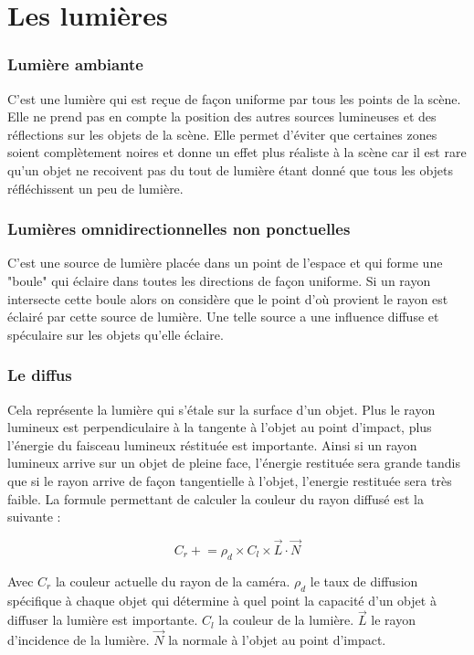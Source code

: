 \documentclass[fontsize=10pt, twoside=no]{scrartcl} %
\begin{document}
\part{Les lumières}

    \section{Lumière ambiante}

C'est une lumière qui est reçue de façon uniforme par tous les points de la scène. Elle ne prend pas en compte la
position des autres sources lumineuses et des réflections sur les objets de la scène. Elle permet d'éviter que certaines
zones soient complètement noires et donne un effet plus réaliste à la scène car il est rare qu'un objet ne recoivent pas
du tout de lumière étant donné que tous les objets réfléchissent un peu de lumière.

    \section{Lumières omnidirectionnelles non ponctuelles}

C'est une source de lumière placée dans un point de l'espace et qui forme une "boule" qui éclaire dans toutes les
directions de façon uniforme. Si un rayon intersecte cette boule alors on considère que le point d'où provient le rayon
est éclairé par cette source de lumière. Une telle source a une influence diffuse et spéculaire sur les objets qu'elle
éclaire.

    \section{Le diffus}

Cela représente la lumière qui s'étale sur la surface d'un objet. Plus le rayon lumineux est perpendiculaire à la
tangente à l'objet au point d'impact, plus l'énergie du faisceau lumineux réstituée est importante. Ainsi si un rayon
lumineux arrive sur un objet de pleine face, l'énergie restituée sera grande tandis que si le rayon arrive de façon
tangentielle à l'objet, l'energie restituée sera très faible. La formule permettant de calculer la couleur du rayon
diffusé est la suivante :

$$C_{r} \mathrel{+}= \rho _{d} \times C_{l} \times \vec{L} \cdot \vec{N}$$

Avec $C_{r}$ la couleur actuelle du rayon de la caméra. $\rho _{d}$ le taux de diffusion spécifique à chaque objet qui détermine à quel
point la capacité d'un objet à diffuser la lumière est importante. $C_{l}$ la couleur de la lumière. $\vec{L}$ le rayon
d'incidence de la lumière. $\vec{N}$ la normale à l'objet au point d'impact.
 
\end{document}
